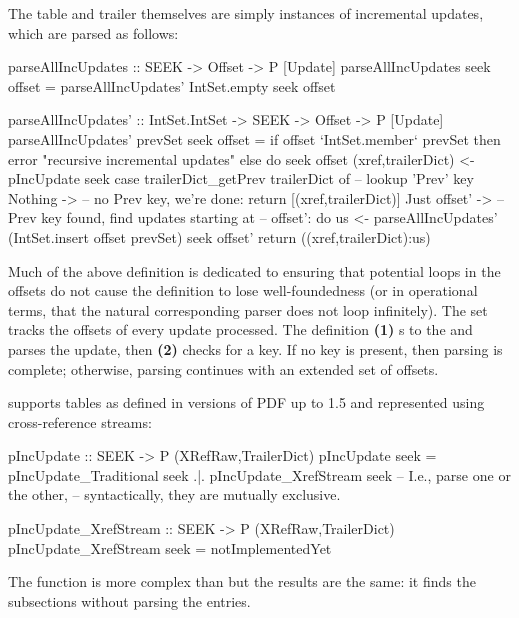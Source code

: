 The \xref{} table and trailer themselves are simply instances of incremental updates, which are parsed as follows:
\lstset{numbers=right}
\begin{code}
parseAllIncUpdates :: SEEK -> Offset -> P [Update]
parseAllIncUpdates seek offset =
  parseAllIncUpdates' IntSet.empty seek offset

parseAllIncUpdates' :: IntSet.IntSet -> SEEK -> Offset -> P [Update]
parseAllIncUpdates' prevSet seek offset =
    if offset `IntSet.member` prevSet then
      error "recursive incremental updates"
    else
      do
      seek offset
      (xref,trailerDict) <- pIncUpdate seek
      case trailerDict_getPrev trailerDict of   -- lookup 'Prev' key
        Nothing      -> -- no Prev key, we're done:
                        return [(xref,trailerDict)]
        Just offset' -> -- Prev key found, find updates starting at
                        -- offset':
                        do
                        us <- parseAllIncUpdates'
                                (IntSet.insert offset prevSet)
                                seek
                                offset'
                        return ((xref,trailerDict):us)
\end{code}
\lstset{numbers=none}
%
Much of the above definition is dedicated to ensuring that potential loops in the  offsets do not cause the definition to lose well-foundedness (or in operational terms, that the natural corresponding parser does not loop infinitely).
%
The set  tracks the offsets of every update processed.
%
The definition %
\textbf{(1)} s to the  and parses the update, then 
\textbf{(2)} checks for a  key.
%
If no key is present, then parsing is complete;
%
otherwise, parsing continues with an extended set of offsets.

 supports \xref{} tables as defined in versions of PDF up to 1.5 and represented using cross-reference streams:
\begin{code}
pIncUpdate :: SEEK -> P (XRefRaw,TrailerDict)
pIncUpdate seek =
      pIncUpdate_Traditional seek
  .|. pIncUpdate_XrefStream seek
      -- I.e., parse one or the other,
      -- syntactically, they are mutually exclusive.

pIncUpdate_XrefStream :: SEEK -> P (XRefRaw,TrailerDict)
pIncUpdate_XrefStream seek = notImplementedYet
\end{code}
%
The function  is more
complex than  but the results
are the same: it finds the subsections
without parsing the \xref{} entries.

